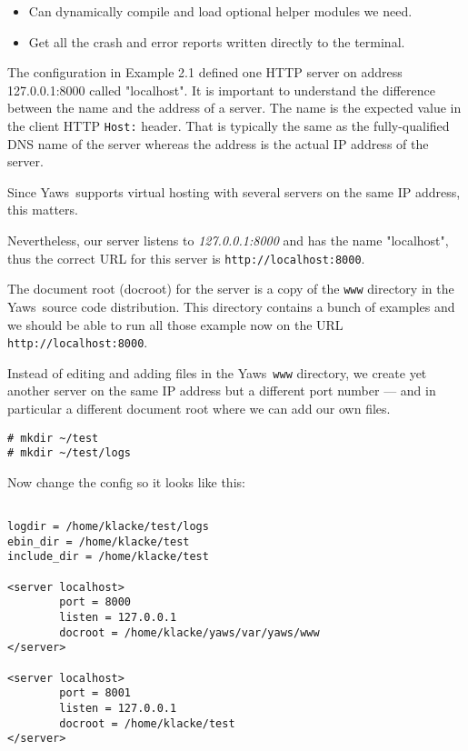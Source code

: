 \documentclass[11pt,oneside,english]{book}
\newcommand{\Yaws}            %
        {{\sc Yaws}}
\begin{document}
\begin{itemize}
\item{Can dynamically compile and load optional helper modules we need.}
\item{Get all the crash and error reports written directly to the
terminal.}
\end{itemize}

The configuration in Example 2.1 defined one HTTP server on address
127.0.0.1:8000 called "localhost".  It is important to understand the
difference between the name and the address of a server. The name is
the expected value in the client HTTP \verb+Host:+ header. That is
typically the same as the fully-qualified DNS name of the server
whereas the address is the actual IP address of the server.

Since \Yaws\  supports virtual hosting with several servers on the same
IP address, this matters.

Nevertheless, our server listens to \textit{127.0.0.1:8000} and
has the name "localhost", thus the correct URL for this server
is \verb+http://localhost:8000+.

The document root (docroot) for the server is a copy of the \verb+www+ directory
in the \Yaws\ source code distribution. This directory contains a bunch of
examples and we should be able to run all those example now on the URL
\verb+http://localhost:8000+.

Instead of editing and adding files in the \Yaws\ \verb+www+
directory, we create yet another server on the same IP address but a
different port number --- and in particular a different document root
where we can add our own files.

\begin{verbatim}
# mkdir ~/test
# mkdir ~/test/logs
\end{verbatim}

Now change the config so it looks like this:

\begin{verbatim}

logdir = /home/klacke/test/logs
ebin_dir = /home/klacke/test
include_dir = /home/klacke/test

<server localhost>
        port = 8000
        listen = 127.0.0.1
        docroot = /home/klacke/yaws/var/yaws/www
</server>

<server localhost>
        port = 8001
        listen = 127.0.0.1
        docroot = /home/klacke/test
</server>


\end{verbatim}
\end{document}
